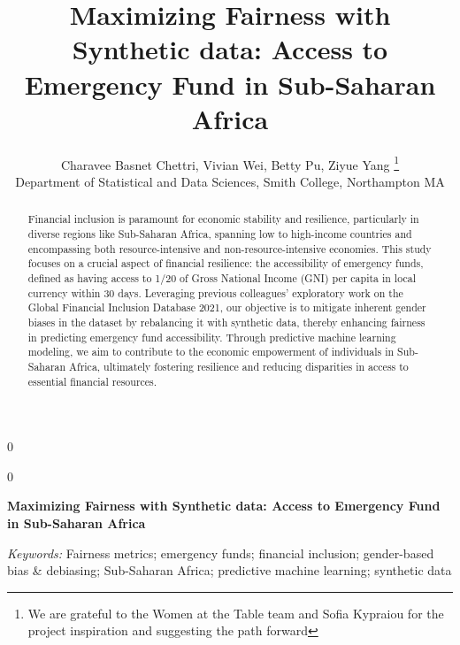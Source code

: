 \documentclass[12pt]{article}
\newcommand{\blind}{0}
\begin{document}
\def\spacingset#1{\renewcommand{\baselinestretch}%
{#1}\small\normalsize} \spacingset{1}



\blind
{
  \title{\bf Maximizing Fairness with Synthetic data: Access to
Emergency Fund in Sub-Saharan Africa}

  \author{
        Charavee Basnet Chettri, Vivian Wei, Betty Pu, Ziyue
Yang \thanks{We are grateful to the Women at the Table team and Sofia
Kypraiou for the project inspiration and suggesting the path forward} \\
    Department of Statistical and Data Sciences, Smith College,
Northampton MA\\
      }
  \maketitle
} \fi

\blind
{
  \bigskip
  \bigskip
  \bigskip
  \begin{center}
    {\LARGE\bf Maximizing Fairness with Synthetic data: Access to
Emergency Fund in Sub-Saharan Africa}
  \end{center}
  \medskip
} \fi

\bigskip
\begin{abstract}
Financial inclusion is paramount for economic stability and resilience,
particularly in diverse regions like Sub-Saharan Africa, spanning low to
high-income countries and encompassing both resource-intensive and
non-resource-intensive economies. This study focuses on a crucial aspect
of financial resilience: the accessibility of emergency funds, defined
as having access to 1/20 of Gross National Income (GNI) per capita in
local currency within 30 days. Leveraging previous colleagues'
exploratory work on the Global Financial Inclusion Database 2021, our
objective is to mitigate inherent gender biases in the dataset by
rebalancing it with synthetic data, thereby enhancing fairness in
predicting emergency fund accessibility. Through predictive machine
learning modeling, we aim to contribute to the economic empowerment of
individuals in Sub-Saharan Africa, ultimately fostering resilience and
reducing disparities in access to essential financial resources.
\end{abstract}

\noindent%
{\it Keywords:} Fairness metrics; emergency funds; financial inclusion;
gender-based bias \& debiasing; Sub-Saharan Africa; predictive machine
learning; synthetic data
\end{document}
